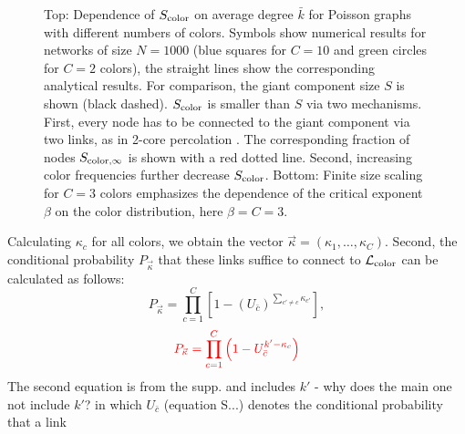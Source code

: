 \documentclass[aps, pre, twocolumn, a4paper, superscriptaddress, floatfix]{revtex4}
\newcommand{\kk}{\bar k }
\newcommand{\red}{\color{red}\footnotesize}
\begin{document}
\begin{figure}[htb]
\begin{center}
    \caption{Top: Dependence of $S_{\rm color}$ on average degree $\kk$ for Poisson graphs with different 
    numbers of colors. Symbols show numerical results for networks of size $N=1000$ 
    (blue squares for $C=10$ and green circles for $C=2$ colors), 
    the straight lines show the corresponding analytical results. For comparison, 
    the giant component size $S$ is shown (black dashed). $S_{\rm color}$ is smaller than $S$ via two mechanisms. First, 
    every node has to be connected to the giant component via two links, as in 2-core percolation \cite{dorogovtsev-prl2006}. The corresponding fraction of 
    nodes $S_{{\rm color},\infty}$ is shown with a red dotted line. Second, increasing color frequencies 
    further decrease $S_{\rm color}$. Bottom: Finite size scaling for $C=3$ colors emphasizes the dependence 
    of the critical exponent $\beta$ on the color distribution, here $\beta=C=3$.
    }
    \label{fig:poisson}
\end{center}
\end{figure}
Calculating $\kappa_c$ for all colors, we obtain the vector ${\vec \kappa}=(\kappa_1,\dots,\kappa_C)$.
Second,  the conditional probability $P_{\vec \kappa}$ that these links suffice to connect to $\mathcal{L}_{\rm color}$ can 
be calculated as follows:
\begin{equation} \label{eq:pveckappa}
P_{\vec \kappa} = \prod_{c=1}^C [1-(U_{\bar c})^{\sum_{c'\neq c} \kappa_{c'} }],
\end{equation}
\begin{equation}
{\red P_{\vec \kappa} = \prod_{c=1}^{C}\left(1 - U_{\bar c}^{k' - \kappa_c}\right)}
\end{equation}
{\footnotesize \red The second equation is from the supp. and includes $k'$ - why does the main one not include $k'$?}
in which $U_{\bar c}$ (equation S...) denotes the conditional probability that a link 
\end{document}

